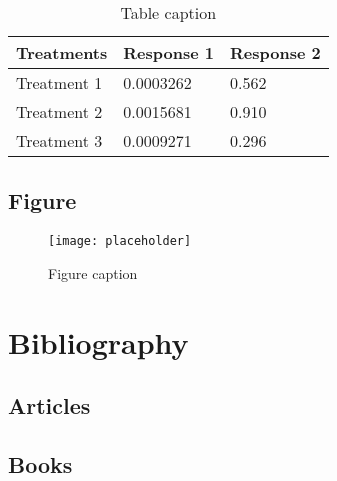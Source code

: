 \documentclass[11pt,fleqn]{book} %
\begin{document}
\begin{table}[h]
	\centering
	\begin{tabular}{l l l}
		\toprule
		\textbf{Treatments} & \textbf{Response 1} & \textbf{Response 2} \\
		\midrule
		Treatment 1         & 0.0003262           & 0.562               \\
		Treatment 2         & 0.0015681           & 0.910               \\
		Treatment 3         & 0.0009271           & 0.296               \\
		\bottomrule
	\end{tabular}
	\caption{Table caption}
\end{table}


\section{Figure}

\begin{figure}[h]
	\centering\texttt{[image: placeholder]}
	\caption{Figure caption}
\end{figure}



\chapter*{Bibliography}


\section*{Articles}
\printbibliography[heading=bibempty,type=article]


\section*{Books}
\printbibliography[heading=bibempty,type=book]



\cleardoublepage
{}
\setlength{\columnsep}{0.75cm}
\printindex

\end{document}
